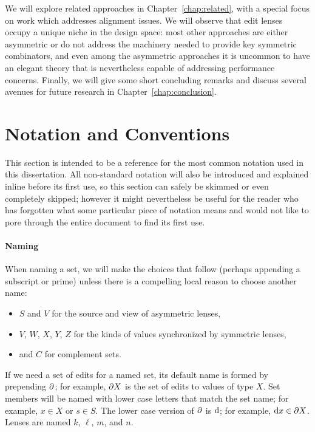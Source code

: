 We will explore related approaches in Chapter~\ref{chap:related}, with a
special focus on work which addresses alignment issues. We will observe that
edit lenses occupy a unique niche in the design space: most other approaches
are either asymmetric or do not address the machinery needed to provide key
symmetric combinators, and even among the asymmetric approaches it is
uncommon to have an elegant theory that is nevertheless capable of
addressing performance concerns.
Finally, we will give some short concluding remarks and discuss several
avenues for future research in Chapter~\ref{chap:conclusion}.

\section{Notation and Conventions}
\label{sec:notation}
This section is intended to be a reference for the most common notation used
in this dissertation. All non-standard notation will also be introduced and
explained inline before its first use, so this section can safely be skimmed
or even completely skipped; however it might nevertheless be useful for the
reader who has forgotten what some particular piece of notation means and
would not like to pore through the entire document to find its first use.

\paragraph*{Naming}
When naming a set, we will make the choices that follow (perhaps appending a
subscript or prime) unless there is a compelling local reason to choose
another name:
\begin{itemize}
    \item $S$ and $V$ for the source and view of asymmetric lenses,
    \item $V$, $W$, $X$, $Y$, $Z$ for the kinds of values synchronized by
        symmetric lenses,
    \item and $C$ for complement sets.
\end{itemize}
If we need a set of edits for a named set, its default name is formed by
prepending $\partial$; for example, $\partial X$ is the set of edits to values of type
$X$. Set members will be named with lower case letters that match the set
name; for example, $x \in X$ or $s \in S$. The lower case version of $\partial$ is
$\textrm{d}$; for example, $\textrm{d} x \in \partial X$. Lenses are named $k$, $\ell$, $m$, and
$n$.

